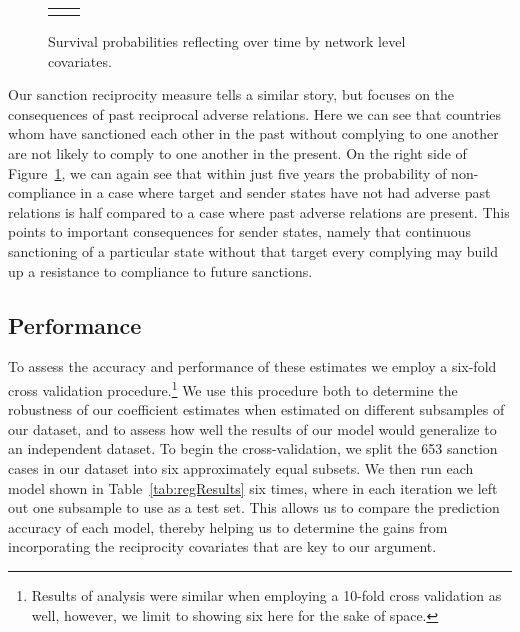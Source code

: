 \begin{figure}[ht]
	\centering
	\caption{Survival probabilities reflecting over time by network level covariates.}
	\begin{tabular}{cc}

	\subfloat[Subfigure 1][Compliance Reciprocity]{
		\resizebox{.45\textwidth}{!}{}
		\label{fig:compSancSurv}} & 
	
	\subfloat[Subfigure 2][Sanction Reciprocity]{
		\resizebox{.45\textwidth}{!}{}
		\label{fig:compSancSurv}}	

	\end{tabular}

	\label{fig:surv3}	
\end{figure}


Our sanction reciprocity measure tells a similar story, but focuses on the consequences of past reciprocal adverse relations. Here we can see that countries whom have sanctioned each other in the past without complying to one another are not likely to comply to one another in the present. On the right side of Figure~\ref{fig:surv3}, we can again see that within just five years the probability of non-compliance in a case where target and sender states have not had adverse past relations is half compared to a case where past adverse relations are present. This points to important consequences for sender states, namely that continuous sanctioning of a particular state without that target every complying  may build up a resistance to compliance to future sanctions. 

\subsection*{Performance}

To assess the accuracy and performance of these estimates we employ a six-fold cross validation procedure.\footnote{Results of analysis were similar when employing a 10-fold cross validation as well, however, we limit to showing six here for the sake of space.} We use this procedure both to determine the robustness of our coefficient estimates when estimated on different subsamples of our dataset, and to assess how well the results of our model would generalize to an independent dataset. To begin the cross-validation, we split the 653 sanction cases in our dataset into six approximately equal subsets. We then run each model shown in Table~\ref{tab:regResults} six times, where in each iteration we left out one subsample to use as a test set. This allows us to compare the prediction accuracy of each model, thereby helping us to determine the gains from incorporating the reciprocity covariates that are key to our argument.

